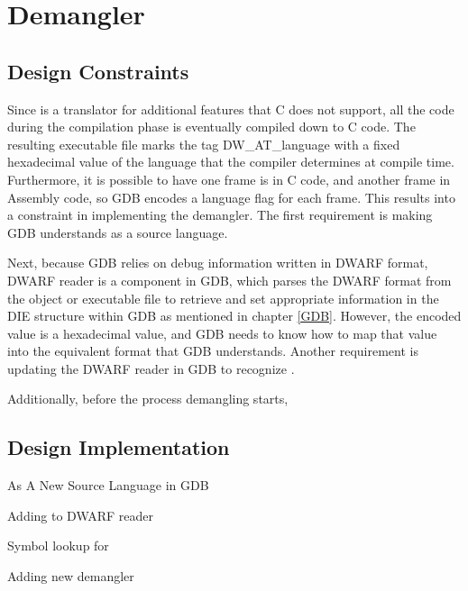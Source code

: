\chapter{\CFAS Demangler} \label{demangler}

\section{Design Constraints}
Since \CFAS is a translator for additional features that C does not support, all
the code during the compilation phase is eventually compiled down to C code.
The resulting executable file marks the tag DW\_AT\_language with a
fixed hexadecimal value of the language that the compiler determines at compile
time. Furthermore, it is possible to have one frame is in C code, and another
frame in Assembly code, so GDB encodes a language flag for each frame. This
results into a constraint in implementing the demangler. The first requirement is
making GDB understands \CFAS as a source language.

Next, because GDB relies on debug information written in DWARF format, DWARF
reader is a component in GDB, which parses the DWARF format from the object or
executable file to retrieve and set
appropriate information in the DIE structure within GDB as mentioned in chapter
\ref{GDB}. However, the encoded value is a hexadecimal value, and GDB needs to
know how to map that value into the equivalent format that GDB understands.
Another requirement is updating the DWARF reader in GDB to recognize \CFA.

Additionally, before the process demangling starts,

\section{Design Implementation}
\CFAS As A New Source Language in GDB

Adding \CFAS to DWARF reader

Symbol lookup for \CFAS

Adding new demangler
